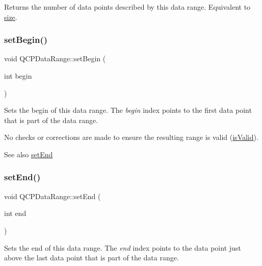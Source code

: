 Returns the number of data points described by this data range. Equivalent to \hyperlink{class_q_c_p_data_range_ac6af055e509d1b691c244954ff1c5887}{size}. \mbox{\label{class_q_c_p_data_range_a54ff59048e01e46ac4aefafc844626c6}} 
\subsubsection{\texorpdfstring{set\+Begin()}{setBegin()}}
{\footnotesize\ttfamily void Q\+C\+P\+Data\+Range\+::set\+Begin (\begin{DoxyParamCaption}\item[{int}]{begin }\end{DoxyParamCaption})\hspace{0.3cm}{\ttfamily [inline]}}

Sets the begin of this data range. The {\itshape begin} index points to the first data point that is part of the data range.

No checks or corrections are made to ensure the resulting range is valid (\hyperlink{class_q_c_p_data_range_aae53a37472212dca0a7939963e20dba0}{is\+Valid}).

\begin{DoxySeeAlso}{See also}
\hyperlink{class_q_c_p_data_range_a277f1a9eafe70b9184d9c00b641ae5de}{set\+End} 
\end{DoxySeeAlso}
\mbox{\label{class_q_c_p_data_range_a277f1a9eafe70b9184d9c00b641ae5de}} 
\subsubsection{\texorpdfstring{set\+End()}{setEnd()}}
{\footnotesize\ttfamily void Q\+C\+P\+Data\+Range\+::set\+End (\begin{DoxyParamCaption}\item[{int}]{end }\end{DoxyParamCaption})\hspace{0.3cm}{\ttfamily [inline]}}

Sets the end of this data range. The {\itshape end} index points to the data point just above the last data point that is part of the data range.

